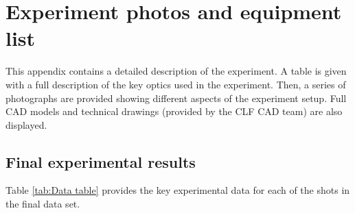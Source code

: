 

\chapter{\label{app:2-experimentphotos} Experiment photos and equipment list}

\minitoc

This appendix contains a detailed description of the experiment. A table is given with a full description of the key optics used in the experiment. Then, a series of photographs are provided showing different aspects of the experiment setup. Full CAD models and technical drawings (provided by the CLF CAD team) are also displayed.

\section{Final experimental results}

Table \ref{tab:Data table} provides the key experimental data for each of the shots in the final data set.

